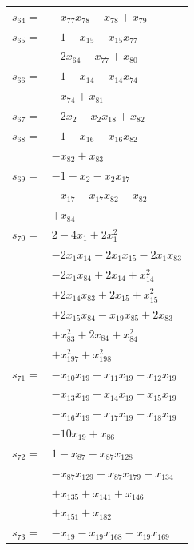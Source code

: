 \begin{longtable}{@{}r@{\;}l@{}}
\(s_{64}=\) & \(\displaystyle -x_{77}x_{78} -x_{78} +x_{79}\) \\[3pt]
\(s_{65}=\) & \(\displaystyle -1 -x_{15} -x_{15}x_{77}\) \\
 & \(\displaystyle -2x_{64} -x_{77} +x_{80}\) \\[3pt]
\(s_{66}=\) & \(\displaystyle -1 -x_{14} -x_{14}x_{74}\) \\
 & \(\displaystyle -x_{74} +x_{81}\) \\[3pt]
\(s_{67}=\) & \(\displaystyle -2x_{2} -x_{2}x_{18} +x_{82}\) \\[3pt]
\(s_{68}=\) & \(\displaystyle -1 -x_{16} -x_{16}x_{82}\) \\
 & \(\displaystyle -x_{82} +x_{83}\) \\[3pt]
\(s_{69}=\) & \(\displaystyle -1 -x_{2} -x_{2}x_{17}\) \\
 & \(\displaystyle -x_{17} -x_{17}x_{82} -x_{82}\) \\
 & \(\displaystyle +x_{84}\) \\[3pt]
\(s_{70}=\) & \(\displaystyle 2 -4x_{1} +2x_{1}^{2}\) \\
 & \(\displaystyle -2x_{1}x_{14} -2x_{1}x_{15} -2x_{1}x_{83}\) \\
 & \(\displaystyle -2x_{1}x_{84} +2x_{14} +x_{14}^{2}\) \\
 & \(\displaystyle +2x_{14}x_{83} +2x_{15} +x_{15}^{2}\) \\
 & \(\displaystyle +2x_{15}x_{84} -x_{19}x_{85} +2x_{83}\) \\
 & \(\displaystyle +x_{83}^{2} +2x_{84} +x_{84}^{2}\) \\
 & \(\displaystyle +x_{197}^{2} +x_{198}^{2}\) \\[3pt]
\(s_{71}=\) & \(\displaystyle -x_{10}x_{19} -x_{11}x_{19} -x_{12}x_{19}\) \\
 & \(\displaystyle -x_{13}x_{19} -x_{14}x_{19} -x_{15}x_{19}\) \\
 & \(\displaystyle -x_{16}x_{19} -x_{17}x_{19} -x_{18}x_{19}\) \\
 & \(\displaystyle -10x_{19} +x_{86}\) \\[3pt]
\(s_{72}=\) & \(\displaystyle 1 -x_{87} -x_{87}x_{128}\) \\
 & \(\displaystyle -x_{87}x_{129} -x_{87}x_{179} +x_{134}\) \\
 & \(\displaystyle +x_{135} +x_{141} +x_{146}\) \\
 & \(\displaystyle +x_{151} +x_{182}\) \\[3pt]
\(s_{73}=\) & \(\displaystyle -x_{19} -x_{19}x_{168} -x_{19}x_{169}\) \\

\end{longtable}
